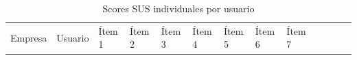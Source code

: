 \begin{longtable}[]{@{}
  >{\raggedright\arraybackslash}p{}
  >{\raggedright\arraybackslash}p{}
  >{\raggedright\arraybackslash}p{}
  >{\raggedright\arraybackslash}p{}
  >{\raggedright\arraybackslash}p{}
  >{\raggedright\arraybackslash}p{}
  >{\raggedright\arraybackslash}p{}
  >{\raggedright\arraybackslash}p{}
  >{\raggedright\arraybackslash}p{}
  >{\raggedright\arraybackslash}p{}
  >{\raggedright\arraybackslash}p{}
  >{\raggedright\arraybackslash}p{}
  >{\raggedright\arraybackslash}p{}@{}}
\caption[Scores SUS individuales por usuario]{Scores SUS individuales por usuario}\tabularnewline
\toprule\noalign{}
\begin{minipage}[b]{\linewidth}\raggedright
Empresa
\end{minipage} & \begin{minipage}[b]{\linewidth}\raggedright
Usuario
\end{minipage} & \begin{minipage}[b]{\linewidth}\raggedright
Ítem 1
\end{minipage} & \begin{minipage}[b]{\linewidth}\raggedright
Ítem 2
\end{minipage} & \begin{minipage}[b]{\linewidth}\raggedright
Ítem 3
\end{minipage} & \begin{minipage}[b]{\linewidth}\raggedright
Ítem 4
\end{minipage} & \begin{minipage}[b]{\linewidth}\raggedright
Ítem 5
\end{minipage} & \begin{minipage}[b]{\linewidth}\raggedright
Ítem 6
\end{minipage} & \begin{minipage}[b]{\linewidth}\raggedright
Ítem 7
\end{minipage} & \begin{minipage}[b]{\linewidth}\raggedright

\end{minipage}
\end{longtable}
